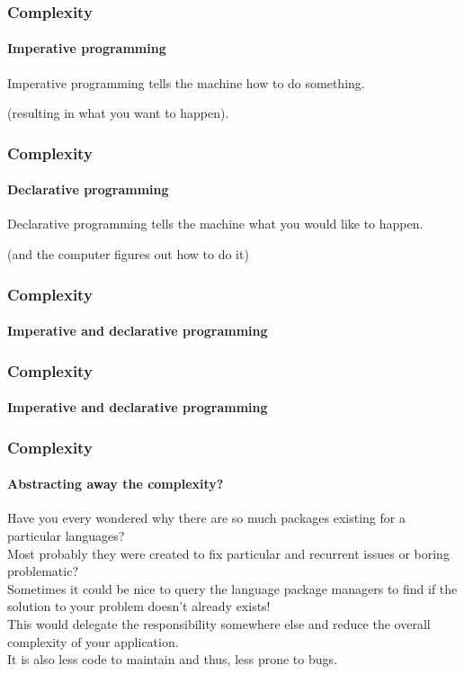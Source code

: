 \begin{frame}
    \frametitle{Complexity}
    \framesubtitle{Imperative programming}

    Imperative programming tells the machine how to do something.

    \pause

    (resulting in what you want to happen).
\end{frame}

\begin{frame}
    \frametitle{Complexity}
    \framesubtitle{Declarative programming}

    Declarative programming tells the machine what you would like to happen.

    \pause

    (and the computer figures out how to do it)
\end{frame}

\begin{frame}
    \frametitle{Complexity}
    \framesubtitle{Imperative and declarative programming}


\pause

\end{frame}

\begin{frame}
    \frametitle{Complexity}
    \framesubtitle{Imperative and declarative programming}


\pause

\end{frame}

\begin{frame}
    \frametitle{Complexity}
    \framesubtitle{Abstracting away the complexity?}

    Have you every wondered why there are so much packages existing for a
    particular languages?\\
    \pause
    Most probably they were created to fix particular and recurrent issues or
    boring problematic?\\
    \pause
    Sometimes it could be nice to query the language package managers to find if
    the solution to your problem doesn't already exists!\\
    \pause
    This would delegate the responsibility somewhere else and reduce the overall
    complexity of your application.\\
    \pause
    It is also less code to maintain and thus, less prone to bugs.
\end{frame}

